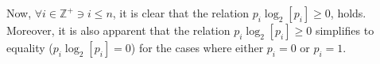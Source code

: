 \documentclass{article}[12pt]
\numberwithin{equation}{subsection}
\begin{document}
\begin{flushleft}
Now, $\forall i \in \mathbb{Z}^+ \ni i \leq n$, it is clear that the relation $p_i \log_2 \left[ p_i \right] \geq 0$, holds.  Moreover, it is also apparent that the relation $p_i \log_2 \left[ p_i \right] \geq 0$ simplifies to equality ($p_i \log_2 \left[ p_i \right] = 0$) for the cases where either $p_i = 0$ or $p_i = 1$. \newline










































































































\end{flushleft}
\end{document}
